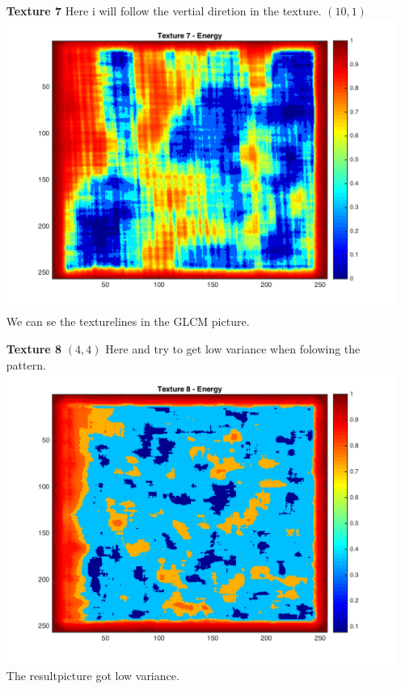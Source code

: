 \documentclass{article}
\begin{document}
\begin{itemize}
\item[\textbf{Texture 7}]
Here i will follow the vertial diretion in the texture. $(10, 1)$
\\
\includegraphics[totalheight=5cm]{t7plot.png}
\\ We can se the texturelines in the GLCM picture.

\item[\textbf{Texture 8}]
$(4,4)$ Here and try to get low variance when folowing the pattern.
\\
\includegraphics[totalheight=5cm]{t8plot.png}\\
The resultpicture got low variance. 
\\
\end{itemize}
\end{document}
